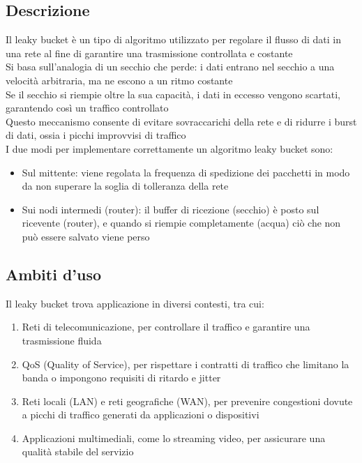 \documentclass[10pt,oneside,a4paper]{article}
\begin{document}
\subsection{Descrizione}
Il leaky bucket è un tipo di algoritmo utilizzato per regolare il flusso di dati in una rete al fine di garantire una trasmissione controllata e costante\\
Si basa sull'analogia di un secchio che perde: i dati entrano nel secchio a una velocità arbitraria, ma ne escono a un ritmo costante\\
Se il secchio si riempie oltre la sua capacità, i dati in eccesso vengono scartati, garantendo così un traffico controllato\\
Questo meccanismo consente di evitare sovraccarichi della rete e di ridurre i burst di dati, ossia i picchi improvvisi di traffico\\
I due modi per implementare correttamente un algoritmo leaky bucket sono:
\begin{itemize}
	\item Sul mittente: viene regolata la frequenza di spedizione dei pacchetti in modo da non superare la soglia di tolleranza della rete
	\item Sui nodi intermedi (router): il buffer di ricezione (secchio) è posto sul ricevente (router), e quando si riempie completamente (acqua) ciò che non può essere salvato viene perso
\end{itemize}
\subsection{Ambiti d'uso}
Il leaky bucket trova applicazione in diversi contesti, tra cui:
\begin{enumerate}
\item Reti di telecomunicazione, per controllare il traffico e garantire una trasmissione fluida
\item QoS (Quality of Service), per rispettare i contratti di traffico che limitano la banda o impongono requisiti di ritardo e jitter
\item Reti locali (LAN) e reti geografiche (WAN), per prevenire congestioni dovute a picchi di traffico generati da applicazioni o dispositivi
\item Applicazioni multimediali, come lo streaming video, per assicurare una qualità stabile del servizio
\end{enumerate}
\end{document}
